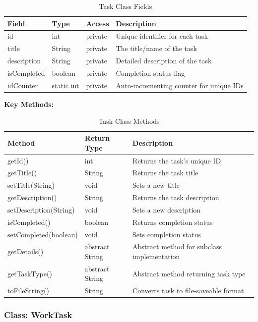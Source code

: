 \documentclass[12pt,a4paper]{article}
\begin{document}
\begin{table}[H]
\centering
\begin{tabular}{|l|l|l|p{6cm}|}
\hline
\textbf{Field} & \textbf{Type} & \textbf{Access} & \textbf{Description} \\
\hline
id & int & private & Unique identifier for each task \\
\hline
title & String & private & The title/name of the task \\
\hline
description & String & private & Detailed description of the task \\
\hline
isCompleted & boolean & private & Completion status flag \\
\hline
idCounter & static int & private & Auto-incrementing counter for unique IDs \\
\hline
\end{tabular}
\caption{Task Class Fields}
\end{table}

\textbf{Key Methods:}

\begin{table}[H]
\centering
\begin{tabular}{|l|l|p{7cm}|}
\hline
\textbf{Method} & \textbf{Return Type} & \textbf{Description} \\
\hline
getId() & int & Returns the task's unique ID \\
\hline
getTitle() & String & Returns the task title \\
\hline
setTitle(String) & void & Sets a new title \\
\hline
getDescription() & String & Returns the task description \\
\hline
setDescription(String) & void & Sets a new description \\
\hline
isCompleted() & boolean & Returns completion status \\
\hline
setCompleted(boolean) & void & Sets completion status \\
\hline
getDetails() & abstract String & Abstract method for subclass implementation \\
\hline
getTaskType() & abstract String & Abstract method returning task type \\
\hline
toFileString() & String & Converts task to file-saveable format \\
\hline
\end{tabular}
\caption{Task Class Methods}
\end{table}

\subsubsection{Class: WorkTask}
\end{document}
